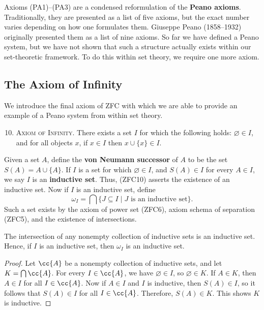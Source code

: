 Axioms (PA1)--(PA3) are a condensed reformulation of the \textbf{Peano axioms}.
Traditionally, they are presented as a list of five axioms, but the exact number varies depending on how one formulates them.
Giuseppe Peano (1858--1932) originally presented them as a list of nine axioms. 
So far we have defined a Peano system, but we have not shown that such a structure actually exists within our set-theoretic framework. 
To do this within set theory, we require one more axiom.



\subsection{The Axiom of Infinity}

We introduce the final axiom of ZFC with which we are able to provide an example of a Peano system from within set theory. 

\begin{enumerate}[itemsep=-0.4ex, label=\textup{(ZFC${\arabic*}$)}]\setcounter{enumi}{9}
	\item\textsc{Axiom of Infinity.}
	There exists a set $I$ for which the following holds: $\varnothing\in I$, and for all objects $x$, if $x\in I$ then $x\cup\{x\}\in I$. 
\end{enumerate}

Given a set $A$, define the \textbf{von Neumann successor} of $A$ to be the set $S(A) = A\cup\{A\}$. 
If $I$ is a set for which $\varnothing\in I$, and $S(A)\in I$ for every $A\in I$, we say $I$ is an \textbf{inductive set}.
Thus, (ZFC10) asserts the existence of an inductive set. 
Now if $I$ is an inductive set, define
\[ \omega_{I} = \bigcap \{ J\subseteq I \;|\; J\text{ is an inductive set} \}. \]
Such a set exists by the axiom of power set (ZFC6), axiom schema of separation (ZFC5), and the existence of intersections. 

\begin{prop}\label{ch1thm_intersection_inductive}
	The intersection of any nonempty collection of inductive sets is an inductive set.
	Hence, if $I$ is an inductive set, then $\omega_{I}$ is an inductive set.
\end{prop}
\begin{proof}
	Let $\cc{A}$ be a nonempty collection of inductive sets, and let $K = \bigcap\cc{A}$.
	For every $I\in\cc{A}$, we have $\varnothing\in I$, so $\varnothing\in K$.
	If $A\in K$, then $A\in I$ for all $I\in\cc{A}$.
	Now if $A\in I$ and $I$ is inductive, then $S(A)\in I$, so it follows that $S(A)\in I$ for all $I\in\cc{A}$.
	Therefore, $S(A)\in K$.
	This shows $K$ is inductive.
\end{proof}

